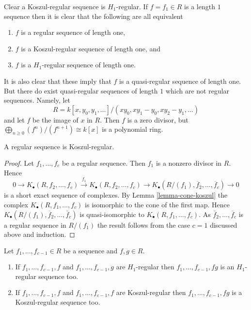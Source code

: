 \noindent
Clear a Koszul-regular sequence is $H_1$-regular. If $f = f_1 \in R$
is a length $1$ sequence then it is clear that the following are
all equivalent
\begin{enumerate}
\item $f$ is a regular sequence of length one,
\item $f$ is a Koszul-regular sequence of length one, and
\item $f$ is a $H_1$-regular sequence of length one.
\end{enumerate}
It is also clear that these imply that $f$ is a quasi-regular sequence
of length one. But there do exist quasi-regular sequences of length $1$
which are not regular sequences. Namely, let
$$
R = k[x, y_0, y_1, \ldots]/(xy_0, xy_1 - y_0, xy_2 - y_1, \ldots)
$$
and let $f$ be the image of $x$ in $R$. Then $f$ is a zero divisor, but
$\bigoplus_{n \geq 0} (f^n)/(f^{n + 1}) \cong k[x]$ is a polynomial ring.

\begin{lemma}
\label{lemma-regular-koszul-regular}
A regular sequence is Koszul-regular.
\end{lemma}

\begin{proof}
Let $f_1, \ldots, f_c$ be a regular sequence. Then $f_1$ is a nonzero
divisor in $R$. Hence
$$
0 \to K_\bullet(R, f_2, \ldots, f_c) \xrightarrow{f_1}
K_\bullet(R, f_2, \ldots, f_c) \to
K_\bullet(R/(f_1), \overline{f}_2, \ldots, \overline{f}_c) \to 0
$$
is a short exact sequence of complexes. By
Lemma \ref{lemma-cone-koszul}
the complex $K_\bullet(R, f_1, \ldots, f_c)$
is isomorphic to the cone of the first map. Hence
$K_\bullet(R/(f_1), \overline{f}_2, \ldots, \overline{f}_c)$
is quasi-isomorphic to $K_\bullet(R, f_1, \ldots, f_c)$.
As $\overline{f}_2, \ldots, \overline{f}_c$ is a regular sequence
in $R/(f_1)$ the result follows from the case $c = 1$ discussed above and
induction.
\end{proof}

\begin{lemma}
\label{lemma-mult-koszul-regular}
Let $f_1, \ldots, f_{c - 1} \in R$ be a sequence and $f, g \in R$.
\begin{enumerate}
\item If $f_1, \ldots, f_{c - 1}, f$ and $f_1, \ldots, f_{c - 1}, g$
are $H_1$-regular then $f_1, \ldots, f_{c - 1}, fg$ is an
$H_1$-regular sequence too.
\item If $f_1, \ldots, f_{c - 1}, f$ and $f_1, \ldots, f_{c - 1}, f$ are
Koszul-regular then $f_1, \ldots, f_{c - 1}, fg$ is a Koszul-regular
sequence too.
\end{enumerate}
\end{lemma}

